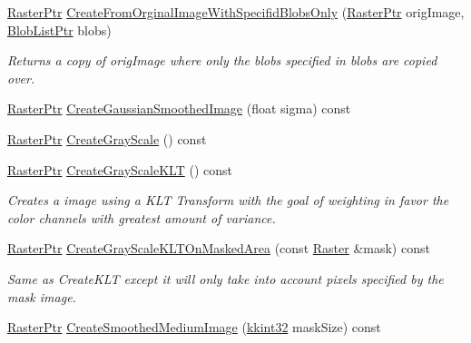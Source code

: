 \begin{DoxyCompactItemize}
\hyperlink{class_k_k_b_1_1_raster_aefa532857fd6aa9eb53f79da55a97c5a}{Raster\+Ptr} \hyperlink{class_k_k_b_1_1_raster_a65c37759a81d05fe07ec1f3ec38ea30f}{Create\+From\+Orginal\+Image\+With\+Specifid\+Blobs\+Only} (\hyperlink{class_k_k_b_1_1_raster_aefa532857fd6aa9eb53f79da55a97c5a}{Raster\+Ptr} orig\+Image, \hyperlink{namespace_k_k_b_a43f0fcfaef97a91bc290134c9a407d4d}{Blob\+List\+Ptr} blobs)
\begin{DoxyCompactList}\small\item\em Returns a copy of \textquotesingle{}orig\+Image\textquotesingle{} where only the blobs specified in \textquotesingle{}blobs\textquotesingle{} are copied over. \end{DoxyCompactList}\item 
\hyperlink{class_k_k_b_1_1_raster_aefa532857fd6aa9eb53f79da55a97c5a}{Raster\+Ptr} \hyperlink{class_k_k_b_1_1_raster_af1178db42e2bd30a47b9ee3e0199d356}{Create\+Gaussian\+Smoothed\+Image} (float sigma) const 
\item 
\hyperlink{class_k_k_b_1_1_raster_aefa532857fd6aa9eb53f79da55a97c5a}{Raster\+Ptr} \hyperlink{class_k_k_b_1_1_raster_ab2a2f8d11f4d51cbc5418069a7b58299}{Create\+Gray\+Scale} () const 
\item 
\hyperlink{class_k_k_b_1_1_raster_aefa532857fd6aa9eb53f79da55a97c5a}{Raster\+Ptr} \hyperlink{class_k_k_b_1_1_raster_afc5e92625a20de51791bd369340d9fa2}{Create\+Gray\+Scale\+K\+LT} () const 
\begin{DoxyCompactList}\small\item\em Creates a image using a K\+LT Transform with the goal of weighting in favor the color channels with greatest amount of variance. \end{DoxyCompactList}\item 
\hyperlink{class_k_k_b_1_1_raster_aefa532857fd6aa9eb53f79da55a97c5a}{Raster\+Ptr} \hyperlink{class_k_k_b_1_1_raster_a279dc0c8311fd9b4cfaf351ae515bba2}{Create\+Gray\+Scale\+K\+L\+T\+On\+Masked\+Area} (const \hyperlink{class_k_k_b_1_1_raster}{Raster} \&mask) const 
\begin{DoxyCompactList}\small\item\em Same as \textquotesingle{}Create\+K\+LT\textquotesingle{} except it will only take into account pixels specified by the \textquotesingle{}mask\textquotesingle{} image. \end{DoxyCompactList}\item 
\hyperlink{class_k_k_b_1_1_raster_aefa532857fd6aa9eb53f79da55a97c5a}{Raster\+Ptr} \hyperlink{class_k_k_b_1_1_raster_a89598f745fffeb6d89c8e01446ff72a3}{Create\+Smoothed\+Medium\+Image} (\hyperlink{namespace_k_k_b_a8fa4952cc84fda1de4bec1fbdd8d5b1b}{kkint32} mask\+Size) const 

\end{DoxyCompactItemize}
